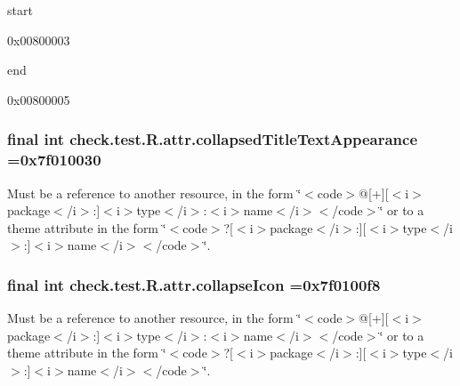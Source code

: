 {\ttfamily start}

0x00800003

{\ttfamily end}

0x00800005\hypertarget{classcheck_1_1test_1_1_r_1_1attr_aad84eb784818494ebe3561b1faae4952}{}
\subsubsection[{collapsed\+Title\+Text\+Appearance}]{\setlength{\rightskip}{0pt plus 5cm}final int check.\+test.\+R.\+attr.\+collapsed\+Title\+Text\+Appearance =0x7f010030\hspace{0.3cm}{\ttfamily [static]}}\label{classcheck_1_1test_1_1_r_1_1attr_aad84eb784818494ebe3561b1faae4952}
Must be a reference to another resource, in the form \char`\"{}$<$code$>$@\mbox{[}+\mbox{]}\mbox{[}$<$i$>$package$<$/i$>$\+:\mbox{]}$<$i$>$type$<$/i$>$\+:$<$i$>$name$<$/i$>$$<$/code$>$\char`\"{} or to a theme attribute in the form \char`\"{}$<$code$>$?\mbox{[}$<$i$>$package$<$/i$>$\+:\mbox{]}\mbox{[}$<$i$>$type$<$/i$>$\+:\mbox{]}$<$i$>$name$<$/i$>$$<$/code$>$\char`\"{}. \hypertarget{classcheck_1_1test_1_1_r_1_1attr_ae765bc74d7af7856f471f981ff65d849}{}
\subsubsection[{collapse\+Icon}]{\setlength{\rightskip}{0pt plus 5cm}final int check.\+test.\+R.\+attr.\+collapse\+Icon =0x7f0100f8\hspace{0.3cm}{\ttfamily [static]}}\label{classcheck_1_1test_1_1_r_1_1attr_ae765bc74d7af7856f471f981ff65d849}
Must be a reference to another resource, in the form \char`\"{}$<$code$>$@\mbox{[}+\mbox{]}\mbox{[}$<$i$>$package$<$/i$>$\+:\mbox{]}$<$i$>$type$<$/i$>$\+:$<$i$>$name$<$/i$>$$<$/code$>$\char`\"{} or to a theme attribute in the form \char`\"{}$<$code$>$?\mbox{[}$<$i$>$package$<$/i$>$\+:\mbox{]}\mbox{[}$<$i$>$type$<$/i$>$\+:\mbox{]}$<$i$>$name$<$/i$>$$<$/code$>$\char`\"{}. \hypertarget{classcheck_1_1test_1_1_r_1_1attr_af9989d7fffc42548bab33bf748aff2e2}{}

